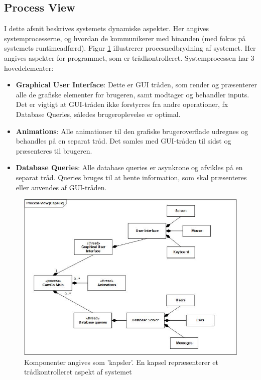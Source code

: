 \documentclass[Arkitektur/System_main.tex]{subfiles}
\begin{document}
\subsection{Process View}
I dette afsnit beskrives systemets dynamiske aspekter. Her angives systemprocesserne, og hvordan de kommunikerer med hinanden (med fokus på systemets runtimeadfærd). Figur \ref{fig:capsule} illustrerer procesnedbrydning af systemet. Her angives aspekter for programmet, som er trådkontrolleret. Systemprocessen har 3 hovedelementer:
\begin{itemize}
    \item \textbf{Graphical User Interface}: Dette er GUI tråden, som render og præsenterer alle de grafiske elementer for brugeren, samt modtager og behandler inputs. Det er vigtigt at GUI-tråden ikke forstyrres fra andre operationer, fx Database Queries, således brugeroplevelse er optimal. 
    \item \textbf{Animations}: Alle animationer til den grafiske brugeroverflade udregnes og behandles på en separat tråd. Det samles med GUI-tråden til sidst og præsenteres til brugeren.
    \item \textbf{Database Queries}: Alle database queries er asynkrone og afvikles på en separat tråd. Queries bruges til at hente information, som skal præsenteres eller anvendes af GUI-tråden.
\end{itemize}
\begin{figure}[H]
    \centering
    \includegraphics[width=1\textwidth]{Arkitektur/4+1View/Graphics/ProcessDiagram.jpg}
    \caption{Komponenter angives som 'kapsler'. En kapsel repræsenterer et trådkontrolleret aspekt af systemet}
    \label{fig:capsule}
\end{figure}
\end{document}
